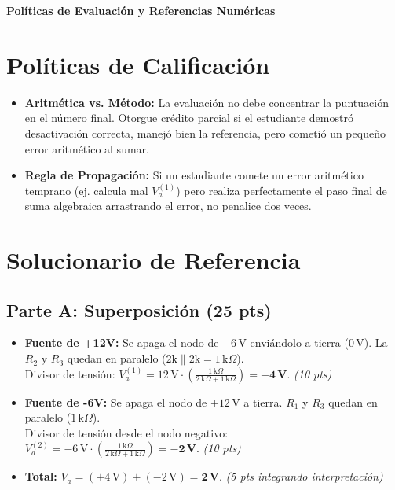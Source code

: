 \documentclass[11pt, a4paper]{article}
\begin{document}
\begin{tcolorbox}[colback=ucbblue!5!white, colframe=ucbblue, title=\textbf{Clave Docente y Guía de Calificación (Marking Guide): Examen EC2}]
    \centering \textbf{Políticas de Evaluación y Referencias Numéricas}
\end{tcolorbox}

\section*{Políticas de Calificación}
\begin{itemize}
    \item \textbf{Aritmética vs. Método:} La evaluación no debe concentrar la puntuación en el número final. Otorgue crédito parcial si el estudiante demostró desactivación correcta, manejó bien la referencia, pero cometió un pequeño error aritmético al sumar.
    \item \textbf{Regla de Propagación:} Si un estudiante comete un error aritmético temprano (ej. calcula mal $V_a^{(1)}$) pero realiza perfectamente el paso final de suma algebraica arrastrando el error, no penalice dos veces.
\end{itemize}

\section*{Solucionario de Referencia}

\subsection*{Parte A: Superposición (25 pts)}
\begin{itemize}
    \item \textbf{Fuente de +12V:} Se apaga el nodo de $-6\,\text{V}$ enviándolo a tierra ($0\,\text{V}$). La $R_2$ y $R_3$ quedan en paralelo ($2\text{k} \parallel 2\text{k} = 1\,\text{k}\Omega$). \\
    Divisor de tensión: $V_a^{(1)} = 12\,\text{V} \cdot \left(\frac{1\,\text{k}\Omega}{2\,\text{k}\Omega + 1\,\text{k}\Omega}\right) = \mathbf{+4\,\text{V}}$. \textit{(10 pts)}
    \item \textbf{Fuente de -6V:} Se apaga el nodo de $+12\,\text{V}$ a tierra. $R_1$ y $R_3$ quedan en paralelo ($1\,\text{k}\Omega$). \\
    Divisor de tensión desde el nodo negativo: $V_a^{(2)} = -6\,\text{V} \cdot \left(\frac{1\,\text{k}\Omega}{2\,\text{k}\Omega + 1\,\text{k}\Omega}\right) = \mathbf{-2\,\text{V}}$. \textit{(10 pts)}
    \item \textbf{Total:} $V_a = (+4\,\text{V}) + (-2\,\text{V}) = \mathbf{2\,\text{V}}$. \textit{(5 pts integrando interpretación)}
\end{itemize}
\end{document}
